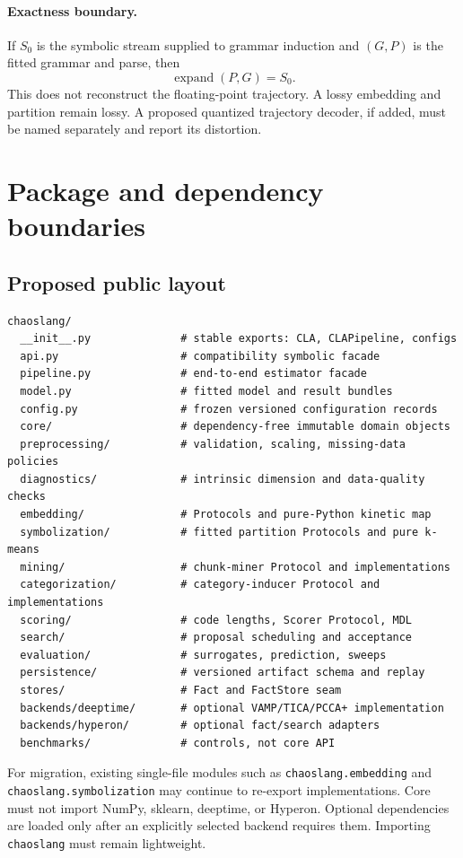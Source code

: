 \documentclass[11pt]{article}
\begin{document}
\paragraph{Exactness boundary.}
If $S_0$ is the symbolic stream supplied to grammar induction and $(G,P)$ is the
fitted grammar and parse, then
\[
  \operatorname{expand}(P,G)=S_0.
\]
This does not reconstruct the floating-point trajectory. A lossy embedding and
partition remain lossy. A proposed quantized trajectory decoder, if added, must
be named separately and report its distortion.

\section{Package and dependency boundaries}

\subsection{Proposed public layout}

\begin{verbatim}
chaoslang/
  __init__.py              # stable exports: CLA, CLAPipeline, configs
  api.py                   # compatibility symbolic facade
  pipeline.py              # end-to-end estimator facade
  model.py                 # fitted model and result bundles
  config.py                # frozen versioned configuration records
  core/                    # dependency-free immutable domain objects
  preprocessing/           # validation, scaling, missing-data policies
  diagnostics/             # intrinsic dimension and data-quality checks
  embedding/               # Protocols and pure-Python kinetic map
  symbolization/           # fitted partition Protocols and pure k-means
  mining/                  # chunk-miner Protocol and implementations
  categorization/          # category-inducer Protocol and implementations
  scoring/                 # code lengths, Scorer Protocol, MDL
  search/                  # proposal scheduling and acceptance
  evaluation/              # surrogates, prediction, sweeps
  persistence/             # versioned artifact schema and replay
  stores/                  # Fact and FactStore seam
  backends/deeptime/       # optional VAMP/TICA/PCCA+ implementation
  backends/hyperon/        # optional fact/search adapters
  benchmarks/              # controls, not core API
\end{verbatim}

For migration, existing single-file modules such as
\texttt{chaoslang.embedding} and \texttt{chaoslang.symbolization} may continue to
re-export implementations. Core must not import NumPy, sklearn, deeptime, or
Hyperon. Optional dependencies are loaded only after an explicitly selected
backend requires them. Importing \texttt{chaoslang} must remain lightweight.
\end{document}
